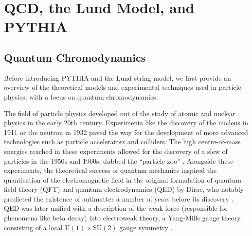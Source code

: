 \documentclass[12pt,a4paper]{report}
\begin{document}
\chapter{QCD, the Lund Model, and PYTHIA}
\label{chap:background}
\section{Quantum Chromodynamics}
Before introducing PYTHIA and the Lund string model, we first provide an overview of the theoretical models and experimental techniques used in particle physics, with a focus on quantum chromodynamics.

The field of particle physics developed out of the study of atomic and nuclear physics in the early 20th century. Experiments like the discovery of the nucleus in 1911 \cite{Rutherford:1911zz} or the neutron in 1932 \cite{Chadwick:1932wcf} paved the way for the development of more advanced technologies such as particle accelerators and colliders. The high centre-of-mass energies reached in these experiments allowed for the discovery of a slew of particles in the 1950s and 1960s, dubbed the ``particle zoo'' \cite{Gross:2022hyw}. Alongside these experiments, the theoretical success of quantum mechanics inspired the quantisation of the electromagnetic field in the original formulation of quantum field theory (QFT) and quantum electrodynamics (QED) by Dirac, who notably predicted the existence of antimatter a number of years before its discovery \cite{Dirac:1928hu,Anderson:1932zz}. QED was later unified with a description of the weak force (responsible for phenomena like beta decay) into electroweak theory, a Yang-Mills gauge theory consisting of a local $\text{U}(1) \times \text{SU}(2)$ gauge symmetry \cite{ParticleDataGroup:2024cfk,Thomson:2013zua}.
\end{document}
